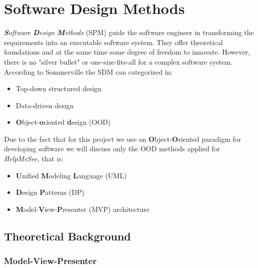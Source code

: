 \documentclass{article}[11]
\begin{document}
\section{Software Design Methods}
	\emph{\textbf{S}oftware \textbf{D}esign \textbf{M}ethods} (SPM) guide the software engineer in transforming the requirements into an executable software system. They offer theoretical foundations and at the same time some degree of freedom to innovate. However, there is no "silver bullet" \cite{brooks1987no} or one-size-fits-all for a complex software system.
According to Sommerville\cite{sommerville2010software} the \ac{SDM} can categorized in:


	\begin{itemize}
		\item Top-down structured design
		\item Data-driven design
		\item \textbf{O}bject-\textbf{o}riented \textbf{d}esign (OOD)
	\end{itemize}

	Due to the fact that for this project we use an \textbf{O}bject-\textbf{O}riented paradigm for developing software we will discuss only the OOD methods applied for \emph{HelpMeSee}, that is:
	
	\begin{itemize}
		\item \textbf{U}nified \textbf{M}odeling \textbf{L}anguage (UML)
		\item  \textbf{D}esign \textbf{P}atterns (DP)
		\item \textbf{M}odel-\textbf{V}iew-\textbf{P}resenter (MVP) architecture
	\end{itemize}
	

\newpage

\subsection{Theoretical Background}

	\subsubsection{Model-View-Presenter}
	
\end{document}
